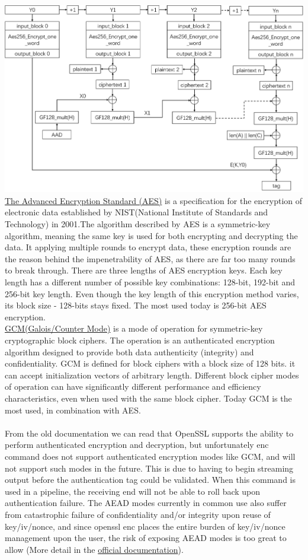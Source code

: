 \documentclass{article}
\begin{document}
\includegraphics[width=\textwidth]{hw01-1884749.png}
\href{https://www.nist.gov/publications/advanced-encryption-standard-aes}{The Advanced Encryption Standard (AES)} is a specification for the encryption of electronic data established by NIST(National Institute of Standards and Technology) in 2001.The algorithm described by AES is a symmetric-key algorithm, meaning the same key is used for both encrypting and decrypting the data. It applying multiple rounds to encrypt data, these encryption rounds are the reason behind the impenetrability of AES, as there are far too many rounds to break through. There are three lengths of AES encryption keys. Each key length has a different number of possible key combinations: 128-bit, 192-bit and 256-bit key length. Even though the key length of this encryption method varies, its block size - 128-bits stays fixed. The most used today is 256-bit AES encryption.\\
\href{https://nvlpubs.nist.gov/nistpubs/legacy/sp/nistspecialpublication800-38d.pdf}{GCM(Galois/Counter Mode)} is a mode of operation for symmetric-key cryptographic block ciphers. The operation is an authenticated encryption algorithm designed to provide both data authenticity (integrity) and confidentiality. GCM is defined for block ciphers with a block size of 128 bits. it can accept initialization vectors of arbitrary length. Different block cipher modes of operation can have significantly different performance and efficiency characteristics, even when used with the same block cipher. Today GCM is the most used, in combination with AES.\\\\
From the old documentation we can read that OpenSSL supports the ability to perform authenticated encryption and decryption, but unfortunately enc command does not support authenticated encryption modes like GCM, and will not support such modes in the future. This is due to having to begin streaming output before the authentication tag could be validated. When this command is used in a pipeline, the receiving end will not be able to roll back upon authentication failure. The AEAD modes currently in common use also suffer from catastrophic failure of confidentiality and/or integrity upon reuse of key/iv/nonce, and since openssl enc places the entire burden of key/iv/nonce management upon the user, the risk of exposing AEAD modes is too great to allow (More detail in the \href{https://www.openssl.org/docs/manmaster/man1/openssl-enc.html}{official documentation}).\\
\end{document}
